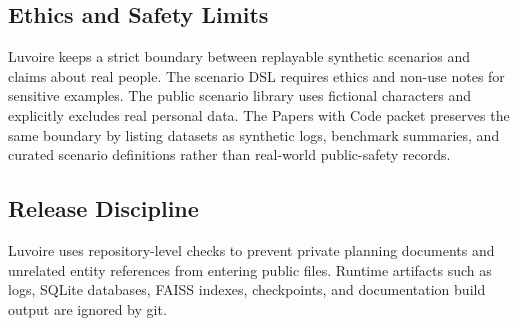 \subsection{Ethics and Safety Limits}

Luvoire keeps a strict boundary between replayable synthetic scenarios and claims about real people. The scenario DSL requires ethics and non-use notes for sensitive examples. The public scenario library uses fictional characters and explicitly excludes real personal data. The Papers with Code packet preserves the same boundary by listing datasets as synthetic logs, benchmark summaries, and curated scenario definitions rather than real-world public-safety records.

\subsection{Release Discipline}

Luvoire uses repository-level checks to prevent private planning documents and unrelated entity references from entering public files. Runtime artifacts such as logs, SQLite databases, FAISS indexes, checkpoints, and documentation build output are ignored by git.
